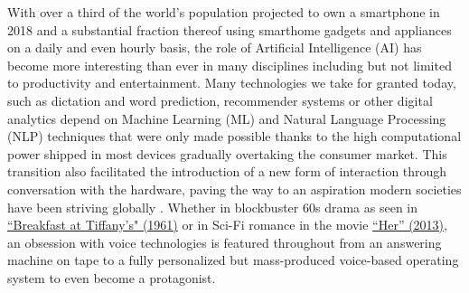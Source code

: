 


With over a third of the world's population projected to own a smartphone in 2018 \cite{statistasmartphones} and a substantial fraction thereof using smarthome gadgets and appliances on a daily and even hourly basis, the role of Artificial Intelligence (AI) has become more interesting than ever in many disciplines including but not limited to productivity and entertainment.
Many technologies we take for granted today, such as dictation and word prediction, recommender systems or other digital analytics depend on Machine Learning (ML) and Natural Language Processing (NLP) techniques that were only made possible thanks to the high computational power shipped in most devices gradually overtaking the consumer market.
This transition also facilitated the introduction of a new form of interaction through conversation with the hardware, paving the way to an aspiration modern societies have been striving globally \cite{Starwars}.
Whether in blockbuster 60s drama as seen in \href{http://www.imdb.com/title/tt0054698/?ref_=nv_sr_1}{``Breakfast at Tiffany's" (1961)} or in Sci-Fi romance in the movie \hypertarget{hermovie}{\href{http://www.imdb.com/title/tt1798709/}{``Her'' (2013)}}, an obsession with voice technologies is featured throughout from an answering machine on tape to a fully personalized but mass-produced voice-based operating system to even become a protagonist.\\

